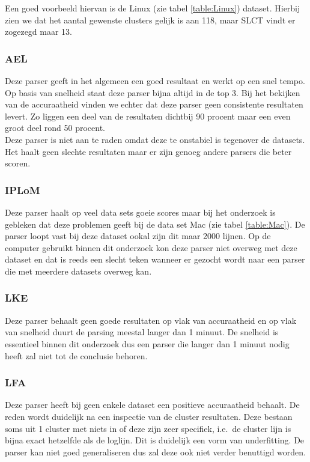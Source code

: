 Een goed voorbeeld hiervan is de Linux (zie tabel \ref{table:Linux}) dataset. Hierbij zien we dat het aantal gewenste clusters gelijk is aan 118, maar SLCT vindt er zogezegd maar 13.

\subsubsection{AEL}
Deze parser geeft in het algemeen een goed resultaat en werkt op een snel tempo. Op basis van snelheid staat deze parser bijna altijd in de top 3. Bij het bekijken van de accuraatheid vinden we echter dat deze parser geen consistente resultaten levert. Zo liggen een deel van de resultaten dichtbij 90 procent maar een even groot deel rond 50 procent.\\

Deze parser is niet aan te raden omdat deze te onstabiel is tegenover de datasets. Het haalt geen slechte resultaten maar er zijn genoeg andere parsers die beter scoren.

\subsubsection{IPLoM}
Deze parser haalt op veel data sets goeie scores maar bij het onderzoek is gebleken dat deze problemen geeft bij de data set Mac (zie tabel \ref{table:Mac}). De parser loopt vast bij deze dataset ookal zijn dit maar 2000 lijnen. Op de computer gebruikt binnen dit onderzoek kon deze parser niet overweg met deze dataset en dat is reeds een slecht teken wanneer er gezocht wordt naar een parser die met meerdere datasets overweg kan.

\subsubsection{LKE}
Deze parser behaalt geen goede resultaten op vlak van accuraatheid en op vlak van snelheid duurt de parsing meestal langer dan 1 minuut. De snelheid is essentieel binnen dit onderzoek dus een parser die langer dan 1 minuut nodig heeft zal niet tot de conclusie behoren.

\subsubsection{LFA} 
Deze parser heeft bij geen enkele dataset een positieve accuraatheid behaalt. De reden wordt duidelijk na een inspectie van de cluster resultaten. Deze bestaan soms uit 1 cluster met niets in of deze zijn zeer specifiek, i.e.\ de cluster lijn is bijna exact hetzelfde als de loglijn. Dit is duidelijk een vorm van underfitting. De parser kan niet goed generaliseren dus zal deze ook niet verder benuttigd worden.

